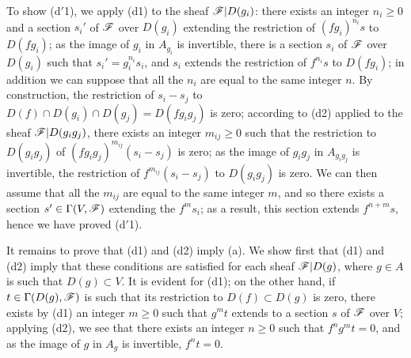 To show (d$'$1), we apply (d1) to the sheaf $\mathscr{F}|D(g_i)$: there exists an integer
$n_i\geqslant 0$ and a section $s_i'$ of $\mathscr{F}$ over $D(g_i)$ extending the restriction of
$(fg_i)^{n_i}s$ to $D(fg_i)$; as the image of $g_i$ in $A_{g_i}$ is invertible, there is a
section $s_i$ of $\mathscr{F}$ over $D(g_i)$ such that $s_i'=g_i^{n_i}s_i$, and $s_i$ extends the
restriction of $f^{n_i}s$ to $D(fg_i)$; in addition we can suppose that all the $n_i$ are
equal to the same integer $n$. By construction, the restriction of $s_i-s_j$ to
$D(f)\cap D(g_i)\cap D(g_j)=D(fg_i g_j)$ is zero; according to (d2) applied to the sheaf
$\mathscr{F}|D(g_i g_j)$, there exists an integer $m_{ij}\geqslant 0$ such that the restriction to
$D(g_i g_j)$ of $(fg_i g_j)^{m_{ij}}(s_i-s_j)$ is zero; as the image of $g_i g_j$ in
$A_{g_i g_j}$ is invertible, the restriction of $f^{m_{ij}}(s_i-s_j)$ to $D(g_i g_j)$ is
zero. We can then assume that all the $m_{ij}$ are equal to the same integer $m$, and so
there exists a section $s'\in\Gamma(V,\mathscr{F})$ extending the $f^m s_i$; as a result, this
section extends $f^{n+m}s$, hence we have proved (d$'$1).

It remains to prove that (d1) and (d2) imply (a). We show first that (d1) and (d2) imply that
these conditions are satisfied for each sheaf $\mathscr{F}|D(g)$, where $g\in A$ is such that
$D(g)\subset V$. It is evident for (d1); on the other hand, if $t\in\Gamma(D(g),\mathscr{F})$ is
such that its restriction to $D(f)\subset D(g)$ is zero, there exists by (d1) an integer
$m\geqslant 0$ such that $g^m t$
extends to a section $s$ of $\mathscr{F}$ over $V$; applying (d2), we see that there exists an
integer $n\geqslant 0$ such that $f^n g^m t=0$, and as the image of $g$ in $A_g$ is
invertible, $f^n t=0$.

